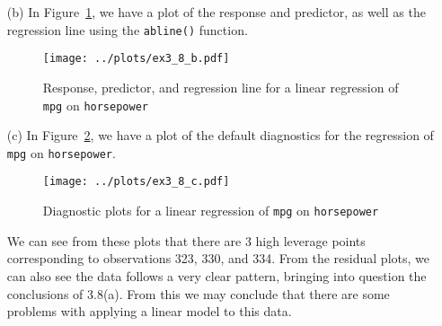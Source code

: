 \begin{itemize}
\begin{itemize}
\begin{verbatim}
1 24.46708 23.97308 24.96108
                \end{verbatim}\normalsize
                from which we conclude that the associated 95\% confidence interval
                is [23.97308, 24.96108] for a predicted value of 24.46708.
                For the prediction interval, we have
                \scriptsize\begin{verbatim}
> predict(lm.fit, data.frame(horsepower = 98), interval = "prediction")
       fit     lwr      upr
1 24.46708 14.8094 34.12476
                \end{verbatim}\normalsize
                so that the interval is [14.8094, 34.12476] for the same predicted
                value.
        \end{itemize}
    \item[(b)] In Figure~\ref{fig9}, we have a plot of the response and predictor,
        as well as the regression line using the \verb|abline()| function.
        \begin{figure}[!ht]
            \texttt{[image: ../plots/ex3\_8\_b.pdf]}
            \caption{Response, predictor, and regression line for a linear regression
            of \\ \texttt{mpg} on \texttt{horsepower}\label{fig9}}
        \end{figure}
    \item[(c)] In Figure~\ref{fig10}, we have a plot of the default diagnostics
        for the regression of \verb|mpg| on \verb|horsepower|.
        \begin{figure}[!ht]
            \texttt{[image: ../plots/ex3\_8\_c.pdf]}
            \caption{Diagnostic plots for a linear regression of \texttt{mpg} on 
            \texttt{horsepower}\label{fig10}}
        \end{figure}
        We can see from these plots that there are 3 high leverage points corresponding
        to observations 323, 330, and 334. From the residual plots, we can also see 
        the data follows a very clear pattern, bringing into question the conclusions
        of 3.8(a). From this we may conclude that there are some problems with applying
        a linear model to this data.
        
\end{itemize}
